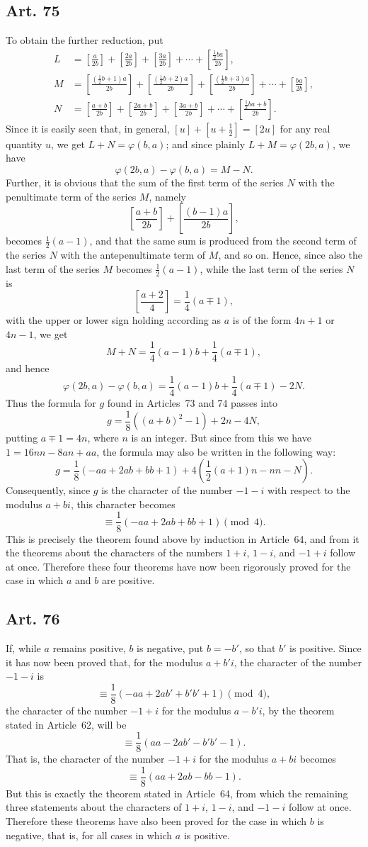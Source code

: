 \documentclass[12pt]{article}
\newcommand{\art}[1]{\subsection*{Art. #1}}
\newcommand{\gbrack}[1]{\left[#1\right]}
\begin{document}
\art{75}
To obtain the further reduction, put
\[
\begin{aligned}
L&=\gbrack{\frac{a}{2b}}+\gbrack{\frac{2a}{2b}}+\gbrack{\frac{3a}{2b}}+\cdots+\gbrack{\frac{\frac12ba}{2b}},\\
M&=\gbrack{\frac{(\frac12b+1)a}{2b}}+\gbrack{\frac{(\frac12b+2)a}{2b}}+\gbrack{\frac{(\frac12b+3)a}{2b}}+\cdots+\gbrack{\frac{ba}{2b}},\\
N&=\gbrack{\frac{a+b}{2b}}+\gbrack{\frac{2a+b}{2b}}+\gbrack{\frac{3a+b}{2b}}+\cdots+\gbrack{\frac{\frac12ba+b}{2b}}.
\end{aligned}
\]
Since it is easily seen that, in general, $[u]+\left[u+\frac12\right]=[2u]$ for any real quantity $u$, we get $L+N=\varphi(b,a)$; and since plainly $L+M=\varphi(2b,a)$, we have
\[
\varphi(2b,a)-\varphi(b,a)=M-N.
\]
Further, it is obvious that the sum of the first term of the series $N$ with the penultimate term of the series $M$, namely
\[
\gbrack{\frac{a+b}{2b}}+\gbrack{\frac{(b-1)a}{2b}},
\]
becomes $\frac12(a-1)$, and that the same sum is produced from the second term of the series $N$ with the antepenultimate term of $M$, and so on. Hence, since also the last term of the series $M$ becomes $\frac12(a-1)$, while the last term of the series $N$ is
\[
\gbrack{\frac{a+2}{4}}=\frac14(a\mp1),
\]
with the upper or lower sign holding according as $a$ is of the form $4n+1$ or $4n-1$, we get
\[
M+N=\frac14(a-1)b+\frac14(a\mp1),
\]
and hence
\[
\varphi(2b,a)-\varphi(b,a)=\frac14(a-1)b+\frac14(a\mp1)-2N.
\]
Thus the formula for $g$ found in Articles~73 and 74 passes into
\[
g=\frac18((a+b)^2-1)+2n-4N,
\]
putting $a\mp1=4n$, where $n$ is an integer. But since from this we have $1=16nn-8an+aa$, the formula may also be written in the following way:
\[
g=\frac18(-aa+2ab+bb+1)+4\left(\frac12(a+1)n-nn-N\right).
\]
Consequently, since $g$ is the character of the number $-1-i$ with respect to the modulus $a+bi$, this character becomes
\[
\equiv \frac18(-aa+2ab+bb+1)\pmod4.
\]
This is precisely the theorem found above by induction in Article~64, and from it the theorems about the characters of the numbers $1+i$, $1-i$, and $-1+i$ follow at once. Therefore these four theorems have now been rigorously proved for the case in which $a$ and $b$ are positive.

\art{76}
If, while $a$ remains positive, $b$ is negative, put $b=-b'$, so that $b'$ is positive. Since it has now been proved that, for the modulus $a+b'i$, the character of the number $-1-i$ is
\[
\equiv \frac18(-aa+2ab'+b'b'+1)\pmod4,
\]
the character of the number $-1+i$ for the modulus $a-b'i$, by the theorem stated in Article~62, will be
\[
\equiv \frac18(aa-2ab'-b'b'-1).
\]
That is, the character of the number $-1+i$ for the modulus $a+bi$ becomes
\[
\equiv \frac18(aa+2ab-bb-1).
\]
But this is exactly the theorem stated in Article~64, from which the remaining three statements about the characters of $1+i$, $1-i$, and $-1-i$ follow at once. Therefore these theorems have also been proved for the case in which $b$ is negative, that is, for all cases in which $a$ is positive.
\end{document}
